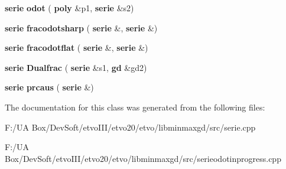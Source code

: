 \begin{DoxyCompactItemize}
\item 
\mbox{\label{classmmgd_1_1mmgd_1_1serie_ae07cb54d85919e3aa78c6ea6a38007b7}} 
\textbf{ serie} {\bfseries odot} (\textbf{ poly} \&p1, \textbf{ serie} \&s2)
\item 
\mbox{\label{classmmgd_1_1mmgd_1_1serie_ac2ac2502c6f1f27a35fbeeea04fb4c16}} 
\textbf{ serie} {\bfseries fracodotsharp} (\textbf{ serie} \&, \textbf{ serie} \&)
\item 
\mbox{\label{classmmgd_1_1mmgd_1_1serie_abcdcbf3dc5fe1c1257a5c3ff5cbc0945}} 
\textbf{ serie} {\bfseries fracodotflat} (\textbf{ serie} \&, \textbf{ serie} \&)
\item 
\mbox{\label{classmmgd_1_1mmgd_1_1serie_a96ec45b632f274cbe3e36ed354c2fb59}} 
\textbf{ serie} {\bfseries Dualfrac} (\textbf{ serie} \&s1, \textbf{ gd} \&gd2)
\item 
\mbox{\label{classmmgd_1_1mmgd_1_1serie_a2c82a0b41c08782a6bfc3412746ee102}} 
\textbf{ serie} {\bfseries prcaus} (\textbf{ serie} \&)
\end{DoxyCompactItemize}


The documentation for this class was generated from the following files\+:\begin{DoxyCompactItemize}
\item 
F\+:/\+U\+A Box/\+Dev\+Soft/etvo\+I\+I\+I/etvo20/etvo/libminmaxgd/src/serie.\+cpp\item 
F\+:/\+U\+A Box/\+Dev\+Soft/etvo\+I\+I\+I/etvo20/etvo/libminmaxgd/src/serieodotinprogress.\+cpp\end{DoxyCompactItemize}
